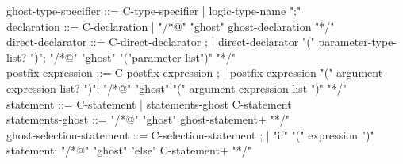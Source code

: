 \begin{syntax}

  ghost-type-specifier ::= C-type-specifier | logic-type-name ";" \\
  declaration ::= C-declaration | "/*@" "ghost" ghost-declaration "*/" \\
  direct-declarator ::= C-direct-declarator ;
    | direct-declarator "(" parameter-type-list? ")";
        "/*@" "ghost" "("parameter-list")" "*/" \\
  postfix-expression ::= C-postfix-expression ;
    | postfix-expression "(" argument-expression-list? ")";
    "/*@" "ghost" "(" argument-expression-list ")" "*/" \\
  statement ::= C-statement | statements-ghost C-statement \\
  statements-ghost ::= "/*@" "ghost" ghost-statement+ "*/" \\
  ghost-selection-statement ::= C-selection-statement ;
    | "if" "(" expression ")" statement;
      "/*@" "ghost" "else" C-statement+ "*/" \\

\end{syntax}

